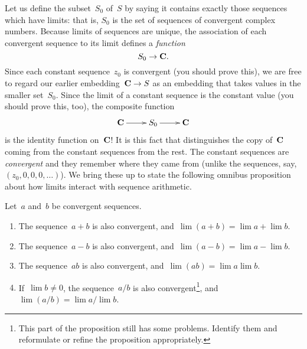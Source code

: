 \documentclass[twocolumn,12pt]{article}
\begin{document}
Let us define the subset~$S_0$ of~$S$ by saying it contains exactly those sequences which have limits: that is, $S_0$ is the set of sequences of convergent complex numbers. Because limits of sequences are unique, the association of each convergent sequence to its limit defines a \emph{function}
\[
  S_0 \to \mathbf{C}.
\]
Since each constant sequence~$z_0$ is convergent (you should prove this), we are free to regard our earlier embedding~$\mathbf{C} \to S$ as an embedding that takes values in the smaller set~$S_0$. Since the limit of a constant sequence is the constant value (you should prove this, too), the composite function
\[
\xymatrix{
    \C \ar[r] & S_0 \ar[r] & \C \\
  }
\]
is the identity function on~$\mathbf{C}$! It is this fact that distinguishes the copy of~$\mathbf{C}$ coming from the constant sequences from the rest. The constant sequences are \emph{convergent} and they remember where they came from (unlike the sequences, say, $(z_0, 0, 0, 0, \ldots)$). We bring these up to state the following omnibus proposition about how limits interact with sequence arithmetic.
\begin{proposition}
  Let~$a$ and~$b$ be convergent sequences. 
  \begin{enumerate}
    \item The sequence~$a + b$ is also convergent, and~$\lim (a + b) = \lim a + \lim b$.
    \item The sequence~$a - b$ is also convergent, and~$\lim (a - b) = \lim a - \lim b$.
    \item The sequence~$a b$ is also convergent, and~$\lim (a  b) = \lim a  \lim b$.
    \item If~$\lim b \ne 0$, the sequence~$a / b$ is also convergent\footnote{This part of the proposition still has some problems. Identify them and reformulate or refine the proposition appropriately.}, and~$\lim (a / b) = \lim a / \lim b$. 
  \end{enumerate}
\end{proposition}
\end{document}
